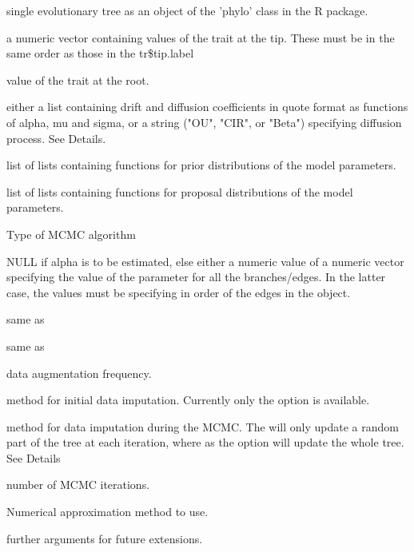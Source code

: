 \documentclass[letterpaper]{book}
\begin{document}
\begin{Arguments}
\begin{ldescription}
\item[\code{tr}] single evolutionary tree as an object of the 'phylo' class in
the  R package.

\item[\code{tipdata}] a numeric vector containing values of the trait at the tip.
These must be in the same order as those in the tr\$tip.label

\item[\code{rt\_value}] value of the trait at the root.

\item[\code{model}] either a list containing drift and diffusion coefficients
in quote format as functions of alpha, mu and sigma,
or a string ("OU", "CIR", or "Beta") specifying diffusion process.
See Details.

\item[\code{priors}] list of lists containing functions for prior distributions
of the model parameters.

\item[\code{proposals}] list of lists containing functions for proposal distributions
of the model parameters.

\item[\code{mcmc\_type}] Type of MCMC algorithm

\item[\code{alpha}] NULL if alpha is to be estimated, else either a numeric
value of a numeric vector specifying the value of the parameter for
all the branches/edges. In the latter case, the values must be
specifying in order of the edges in the  object.

\item[\code{mu}] same as 

\item[\code{sigma}] same as 

\item[\code{N}] data augmentation frequency.

\item[\code{init\_method}] method for initial data imputation.
Currently only the  option is available.

\item[\code{update\_method}] method for data imputation during the MCMC.
The  will only update a random part of the tree at each
iteration, where as the option  will update the whole tree. See Details

\item[\code{iters}] number of MCMC iterations.

\item[\code{method}] Numerical approximation method to use.

\item[\code{...}] further arguments for future extensions.
\end{ldescription}
\end{Arguments}
\end{document}
